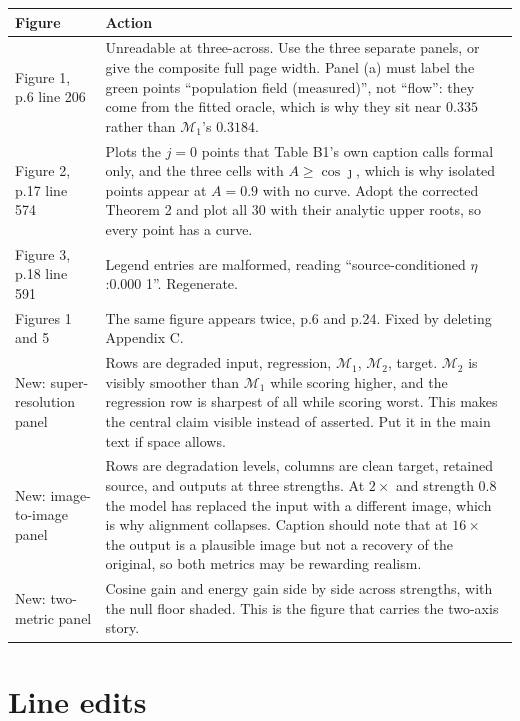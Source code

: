 \documentclass[11pt]{article}
\newcommand{\M}{\mathcal M}
\begin{document}
\begin{longtable}{@{}p{}p{}@{}}
\toprule
Figure & Action\\
\midrule
\endhead
Figure 1, p.6 line 206 &
Unreadable at three-across. Use the three separate panels, or give the composite full page width.
Panel (a) must label the green points ``population field (measured)'', not ``flow'': they come
from the fitted oracle, which is why they sit near $0.335$ rather than $\M_1$'s $0.3184$.\\
\addlinespace
Figure 2, p.17 line 574 &
Plots the $j=0$ points that Table B1's own caption calls formal only, and the three cells with
$A\ge\cos\jmath$, which is why isolated points appear at $A=0.9$ with no curve. Adopt the
corrected Theorem 2 and plot all $30$ with their analytic upper roots, so every point has a
curve.\\
\addlinespace
Figure 3, p.18 line 591 &
Legend entries are malformed, reading ``source-conditioned $\eta$:0.000 1''. Regenerate.\\
\addlinespace
Figures 1 and 5 &
The same figure appears twice, p.6 and p.24. Fixed by deleting Appendix C.\\
\addlinespace
New: super-resolution panel &
Rows are degraded input, regression, $\M_1$, $\M_2$, target. $\M_2$ is visibly smoother than
$\M_1$ while scoring higher, and the regression row is sharpest of all while scoring worst. This
makes the central claim visible instead of asserted. Put it in the main text if space allows.\\
\addlinespace
New: image-to-image panel &
Rows are degradation levels, columns are clean target, retained source, and outputs at three
strengths. At $2\times$ and strength $0.8$ the model has replaced the input with a different
image, which is why alignment collapses. Caption should note that at $16\times$ the output is a
plausible image but not a recovery of the original, so both metrics may be rewarding realism.\\
\addlinespace
New: two-metric panel &
Cosine gain and energy gain side by side across strengths, with the null floor shaded. This is
the figure that carries the two-axis story.\\
\bottomrule
\end{longtable}

\section{Line edits}
\end{document}
